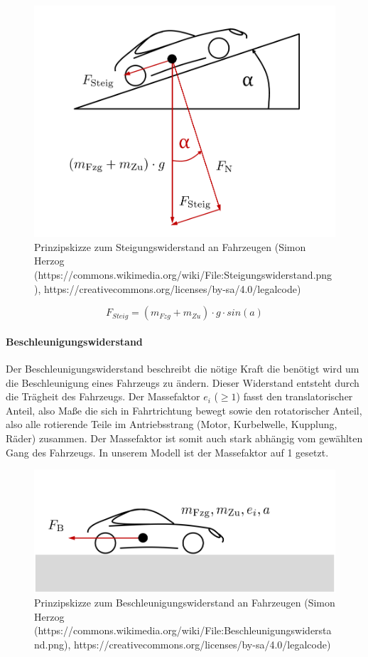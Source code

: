 \documentclass[12pt,a4paper,bibliography=totocnumbered,listof=totocnumbered, abstracton]{scrartcl}
\theoremstyle{Umgebung}
\begin{document}
\begin{figure}
	\centering
	\includegraphics[width=0.7\linewidth]{img/practical/Steigungswiderstand}
	\caption{Prinzipskizze zum Steigungswiderstand an Fahrzeugen (Simon Herzog (https://commons.wikimedia.org/wiki/File:Steigungswiderstand.png), https://creativecommons.org/licenses/by-sa/4.0/legalcode)}
	\label{fig:Steigungswiderstand}
\end{figure}

\begin{equation}
F_{Steig} = (m_{Fzg} + m_{Zu}) \cdot g \cdot sin(a)
\end{equation}

\paragraph{Beschleunigungswiderstand}

Der Beschleunigungswiderstand beschreibt die nötige Kraft die benötigt wird um die Beschleunigung eines Fahrzeugs zu ändern. Dieser Widerstand entsteht durch die Trägheit des Fahrzeugs. Der Massefaktor $e_i$ ($\ge 1$) fasst den translatorischer Anteil, also Maße die sich in Fahrtrichtung bewegt sowie den rotatorischer Anteil, also alle rotierende Teile im Antriebsstrang (Motor, Kurbelwelle, Kupplung, Räder) zusammen. Der Massefaktor ist somit auch stark abhängig vom gewählten Gang des Fahrzeugs. In unserem Modell ist der Massefaktor auf 1 gesetzt.

\begin{figure}
	\centering
	\includegraphics[width=0.7\linewidth]{img/practical/Beschleunigungswiderstand}
	\caption{Prinzipskizze zum Beschleunigungswiderstand an Fahrzeugen (Simon Herzog (https://commons.wikimedia.org/wiki/File:Beschleunigungswiderstand.png), https://creativecommons.org/licenses/by-sa/4.0/legalcode)}
	\label{fig:Beschleunigungswiderstand}
\end{figure}
\end{document}
